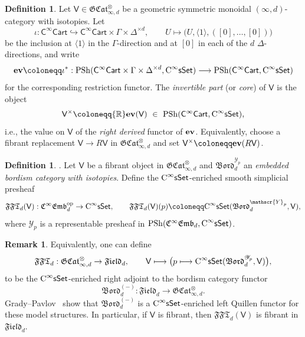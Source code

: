 \documentclass{amsart}
\newcommand{\cat}[1]{\mathsf{#1}}
\newcommand{\sset}{\cat{sSet}}
\newcommand{\CsSet}{\textnormal{C}^{\infty}\sset}
\newcommand{\field}[1]{\mathfrak{Field}_{#1}}
\newcommand{\Cart}{\cat{C}^{\infty}\cat{Cart}}
\newcommand{\femb}[1]{\mathfrak{C}^{\infty}\mathfrak{Emb}_{#1}}
\newcommand{\Bord}{\mathfrak{Bord}}
\newcommand{\FFT}{\mathfrak{FFT}}
\newcommand{\GCat}{\mathfrak{G}\mathfrak{Cat}}
\renewcommand{\ev}{\textnormal{\textbf{ev}}}
\newcommand{\psh}{\mathrm{PSh}}
\newcommand{\ra}{\rightarrow}
\newcommand{\RR}{{\mathbb{R}}}
\renewcommand{\op}{\mathrm{op}}
\newcommand{\Yo}{\mathscr{Y}}
\theoremstyle{definition}
\newtheorem{definition}[equation]{Definition}
\newtheorem{remark}[equation]{Remark}
\numberwithin{equation}{subsection}
\numberwithin{subsubsection}{subsection}
\begin{document}
\begin{definition}\label{def:core.of.V}
  Let \(\cat{V}\in
  \GCat^{\otimes}_{\infty,d}\) be a geometric
  symmetric monoidal \((\infty,d)\)-category with isotopies.
  Let
  \[
    \iota: \Cart \hookrightarrow \Cart\times
    \Gamma\times\Delta^{\times d},
    \qquad
    U\longmapsto
    \bigl(U,\langle 1 \rangle,([0],\ldots,[0])\bigr)
  \]
  be the inclusion at \(\langle 1 \rangle\) in the \(\Gamma\)-direction
  and at \([0]\) in each of the \(d\) \(\Delta\)-directions, and write
  \[
    \ev\coloneqq \iota^{*}:
    \psh(\Cart\times\Gamma\times\Delta^{\times d},\CsSet)
    \longrightarrow
    \psh(\Cart,\CsSet)
  \]
  for the corresponding restriction functor. The \emph{invertible
  part} (or \emph{core})
  of \(\cat{V}\) is the object
  \[
    \cat{V}^{\times} \coloneqq \RR\ev(\cat{V})
    \ \in\ \psh(\Cart,\CsSet),
  \]
  i.e., the value on \(\cat{V}\) of the \emph{right derived}
  functor of \(\ev\).
  Equivalently, choose a fibrant replacement \(\cat{V}\to
  R\cat{V}\) in
  \(\GCat^{\otimes}_{\infty,d}\) and set
  \(\cat{V}^{\times}\coloneqq \ev(R\cat{V})\).
\end{definition}

\begin{definition}\label{def:field.theory.field.stack}
  \textnormal{\cite[Definition~4.1.3]{GP22}}.
  Let \(\cat{V}\) be a fibrant object in
  \(\GCat^{\otimes}_{\infty,d}\) and
  \(\Bord_{d}^{\Yo_{p}}\) an \emph{embedded bordism category with isotopies}.
  Define the \(\CsSet\)-enriched smooth simplicial presheaf
  \[
    \FFT_d(\cat{V}):\femb{d}^{\op}\ra\CsSet,
    \qquad
    \FFT_d(\cat{V})(p)
    \coloneqq
    \CsSet(\Bord_{d}^{\Yo_{p}},\cat{V}),
  \]
  where \(\Yo_{p}\) is a representable presheaf in
  \(\psh(\femb{d},\CsSet)\).
\end{definition}

\begin{remark}\label{rem:bordism.field.theory.Quillen.adjunction}
  Equivalently, one can define
  \[
    \FFT_d:\GCat_{\infty,d}^{\otimes}\ra\field{d},
    \qquad
    \cat{V}\longmapsto
    \bigl(p\longmapsto
    \CsSet(\Bord_d^{\Yo_p},\cat{V})\bigr),
  \]
  to be the \(\CsSet\)-enriched right adjoint to the bordism
  category functor
  \[
    \Bord_d^{(-)}:\field{d}\ra\GCat_{\infty,d}^{\otimes}.
  \]
  Grady--Pavlov~\cite[Theorem~6.0.2]{GP23} show that
  \(\Bord_d^{(-)}\) is a \(\CsSet\)-enriched left Quillen functor
  for these model structures. In particular, if \(\cat{V}\) is fibrant,
  then \(\FFT_d(\cat{V})\) is fibrant in \(\field{d}\).
\end{remark}
\end{document}

